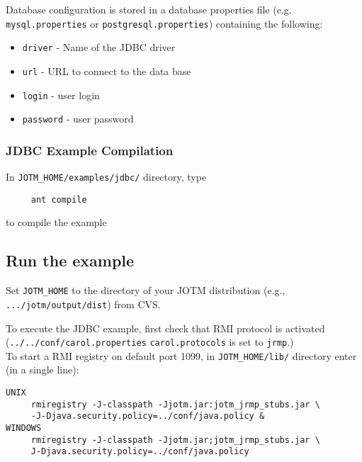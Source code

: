 \documentclass[a4paper,11pt]{article}
\begin{document}
Database configuration is stored in a database properties file (e.g. \texttt{mysql.properties} 
or \texttt{postgresql.properties}) containing the following:

\begin{itemize}
\item \texttt{driver} - Name of the JDBC driver
\item \texttt{url} - URL to connect to the data base
\item \texttt{login} - user login
\item \texttt{password} - user password 
\end{itemize}

\subsubsection{JDBC Example Compilation}
In \texttt{JOTM\_HOME/examples/jdbc/} directory, type
\begin{verbatim}
     ant compile
\end{verbatim}
to compile the example

\subsection{Run the example}
\label{sec:jdbc_run}
Set \texttt{JOTM\_HOME} to the directory of your JOTM distribution (e.g.,
\texttt{.../jotm/output/dist}) from CVS.

\noindent To execute the JDBC example, first check that RMI protocol is
activated (\texttt{../../conf/carol.properties} \texttt{carol.protocols}
 is set to \texttt{jrmp}.) \\
To start a RMI registry on default port 1099, in \texttt{JOTM\_HOME/lib/} directory enter 
 (in a single line):
\begin{verbatim}
UNIX
     rmiregistry -J-classpath -Jjotm.jar:jotm_jrmp_stubs.jar \
     -J-Djava.security.policy=../conf/java.policy &
WINDOWS
     rmiregistry -J-classpath -Jjotm.jar;jotm_jrmp_stubs.jar \
     J-Djava.security.policy=../conf/java.policy
\end{verbatim}
\end{document}
